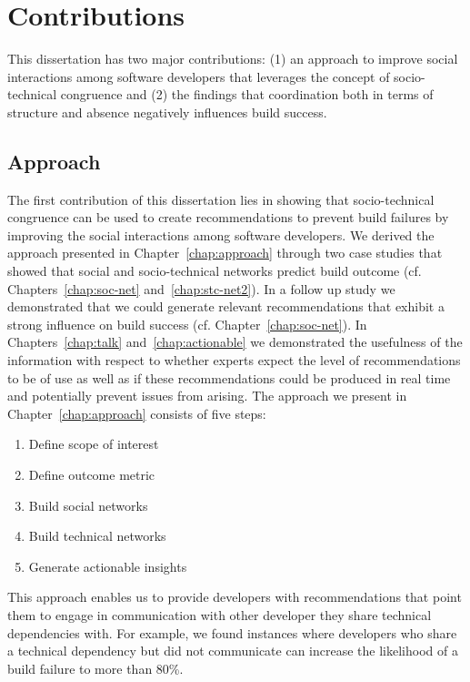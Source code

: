 \section{Contributions}
This dissertation has two major contributions: (1) an approach to improve social interactions among software developers that leverages the concept of socio-technical congruence and (2)
the findings that coordination both in terms of structure and absence negatively influences build success.

\subsection{Approach}
The first contribution of this dissertation lies in showing that socio-technical congruence can be used to create recommendations to prevent build failures by improving the social interactions among software developers.
We derived the approach presented in Chapter~\ref{chap:approach} through two case studies that showed that social and socio-technical networks predict build outcome (cf. Chapters~\ref{chap:soc-net} and~\ref{chap:stc-net2}).
In a follow up study we demonstrated that we could generate relevant recommendations that exhibit a strong influence on build success (cf. Chapter~\ref{chap:soc-net}).
In Chapters~\ref{chap:talk} and~\ref{chap:actionable} we demonstrated the usefulness of the information with respect to whether experts expect the level of recommendations to be of use as well as if these recommendations could be produced in real time and potentially prevent issues from arising.
The approach we present in Chapter~\ref{chap:approach} consists of five steps:

\begin{enumerate}
\item Define scope of interest
\item Define outcome metric
\item Build social networks
\item Build technical networks
\item Generate actionable insights
\end{enumerate}

This approach enables us to provide developers with recommendations that point them to engage in communication with other developer they share technical dependencies with.
For example, we found instances where developers who share a technical dependency but did not communicate can increase the likelihood of a build failure to more than 80\%.



